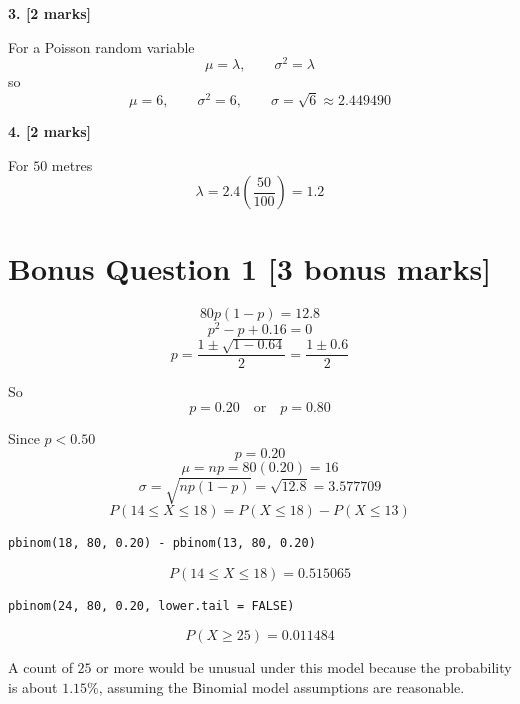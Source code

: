 \documentclass[10pt,letterpaper]{article}
\begin{document}
\textbf{3. [2 marks]}

For a Poisson random variable
$$\mu=\lambda,\qquad \sigma^2=\lambda$$
so
$$\boxed{\mu=6,\qquad \sigma^2=6,\qquad \sigma=\sqrt6\approx2.449490}$$

\textbf{4. [2 marks]}

For \(50\) metres
$$\lambda=2.4\left(\frac{50}{100}\right)=\boxed{1.2}$$

\newpage

\section*{Bonus Question 1 \hfill [3 bonus marks]}

$$80p(1-p)=12.8$$
$$\boxed{p^2-p+0.16=0}$$
$$p=\frac{1\pm\sqrt{1-0.64}}{2}=\frac{1\pm0.6}{2}$$

So
$$p=0.20\quad\text{or}\quad p=0.80$$

Since \(p<0.50\)
$$p=0.20$$
$$\mu=np=80(0.20)=\boxed{16}$$
$$\sigma=\sqrt{np(1-p)}=\sqrt{12.8}=\boxed{3.577709}$$
$$P(14\le X\le18)=P(X\le18)-P(X\le13)$$

\begin{lstlisting}
pbinom(18, 80, 0.20) - pbinom(13, 80, 0.20)
\end{lstlisting}
$$\boxed{P(14\le X\le18)=0.515065}$$

\begin{lstlisting}
pbinom(24, 80, 0.20, lower.tail = FALSE)
\end{lstlisting}
$$\boxed{P(X\ge25)=0.011484}$$

A count of \(25\) or more would be unusual under this model because the probability is about \(1.15\%\), assuming the Binomial model assumptions are reasonable.
\end{document}
